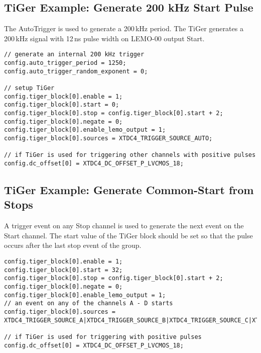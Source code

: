 \subsection{TiGer Example: Generate 200 kHz Start Pulse}
The AutoTrigger is used to generate a 200\,kHz period. The TiGer generates a 200\,kHz signal with 12\,ns pulse width on LEMO-00 output Start.
\begin{lstlisting}[frame=tlrb]
// generate an internal 200 kHz trigger
config.auto_trigger_period = 1250;
config.auto_trigger_random_exponent = 0;

// setup TiGer
config.tiger_block[0].enable = 1;
config.tiger_block[0].start = 0;
config.tiger_block[0].stop = config.tiger_block[0].start + 2;
config.tiger_block[0].negate = 0;
config.tiger_block[0].enable_lemo_output = 1;
config.tiger_block[0].sources = XTDC4_TRIGGER_SOURCE_AUTO;

// if TiGer is used for triggering other channels with positive pulses
config.dc_offset[0] = XTDC4_DC_OFFSET_P_LVCMOS_18; 
\end{lstlisting}

\subsection{TiGer Example: Generate Common-Start from Stops}
A trigger event on any Stop channel is used to generate the next event on the Start channel. 
The start value of the TiGer block should be set so that the pulse occurs after the last stop event of the group.
\begin{lstlisting}[frame=tlrb]
config.tiger_block[0].enable = 1;
config.tiger_block[0].start = 32;
config.tiger_block[0].stop = config.tiger_block[0].start + 2;
config.tiger_block[0].negate = 0;
config.tiger_block[0].enable_lemo_output = 1;
// an event on any of the channels A - D starts 
config.tiger_block[0].sources = XTDC4_TRIGGER_SOURCE_A|XTDC4_TRIGGER_SOURCE_B|XTDC4_TRIGGER_SOURCE_C|XTDC4_TRIGGER_SOURCE_D;

// if TiGer is used for triggering with positive pulses
config.dc_offset[0] = XTDC4_DC_OFFSET_P_LVCMOS_18; 
\end{lstlisting}
